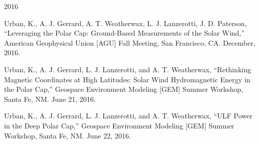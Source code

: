
\begin{center} \Large{2016} \end{center}
\normalsize
\begin{itemize*}
  \item
    Urban, K., A. J. Gerrard, A. T. Weatherwax, L. J. Lanzerotti, J. D. Paterson, 
    ``Leveraging the Polar Cap: Ground-Based Measurements of the Solar Wind,'' 
    American Geophysical Union [AGU] Fall Meeting, 
    San Francisco, CA. December, 2016.
  \item
    Urban, K., A. J. Gerrard, L. J. Lanzerotti, and A. T. Weatherwax, 
    ``Rethinking Magnetic Coordinates at High Latitudes: Solar Wind Hydromagnetic Energy in the Polar Cap,'' 
    Geospace Environment Modeling [GEM] Summer Workshop, 
    Santa Fe, NM. June 21, 2016.
  \item
    Urban, K., A. J. Gerrard, L. J. Lanzerotti, and A. T. Weatherwax, 
    ``ULF Power in the Deep Polar Cap,'' 
    Geospace Environment Modeling [GEM] Summer Workshop,
    Santa Fe, NM. June 22, 2016.
\end{itemize*}


